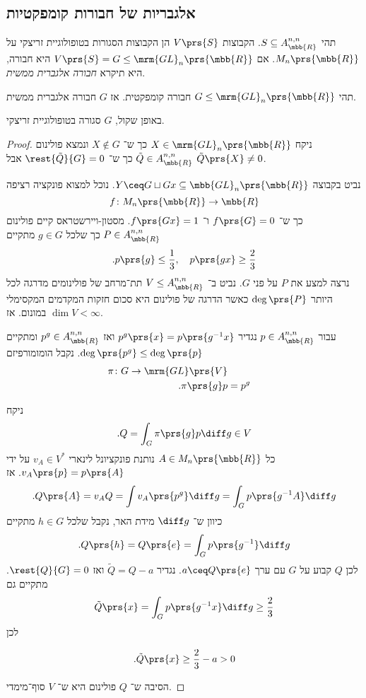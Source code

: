 \documentclass[10pt, twoside]{book}
\begin{document}

\subsection{אלגבריות של חבורות קומפקטיות}

\begin{definition}
תהי
$S \subseteq A_{\mbb{R}}^{n, n}$.
הקבוצות
$V\prs{S}$
הן הקבוצות הסגורות בטופולוגיית זריצקי על
$M_n\prs{\mbb{R}}$.
אם
$V\prs{S} = G \leq \mrm{GL}_n\prs{\mbb{R}}$
היא חבורה, היא תיקרא
\emph{חבורה אלגברית ממשית}.
\end{definition}

\begin{theorem}
תהי
$G \leq \mrm{GL}_n\prs{\mbb{R}}$
חבורה קומפקטית. אז
$G$
חבורה אלגברית ממשית.

באופן שקול,
$G$
סגורה בטופולוגיית זריצקי.
\end{theorem}

\begin{proof}
ניקח
$X \in \mrm{GL}_n\prs{\mbb{R}}$
כך ש־%
$X \notin G$
ונמצא פולינום
$\tilde{Q} \in A^{n,n}_{\mbb{R}}$
כך ש־%
$\rest{\tilde{Q}}{G} = 0$
אבל
$\tilde{Q}\prs{X} \neq 0$.

נביט בקבוצה
$Y \ceq G \sqcup G x \subseteq \mbb{GL}_n\prs{\mbb{R}}$.
נוכל למצוא פונקציה רציפה
\[f \colon M_n\prs{\mbb{R}} \to \mbb{R}\]
כך ש־%
$f\prs{G} = 0$
ו־%
$f\prs{G x} = 1$.
מסטון-ויירשטראס קיים פולינום
$P \in A^{n,n}_{\mbb{R}}$
כך שלכל
$g \in G$
מתקיים
\[\text{.} p\prs{g} \leq \frac{1}{3}, \quad p\prs{gx} \geq \frac{2}{3}\]
נרצה למצע את
$P$
על פני
$G$.
נביט ב־%
$V \leq A^{n,n}_{\mbb{R}}$
תת־מרחב של פולינומים מדרגה לכל היותר
$\deg\prs{P}$
כאשר הדרגה של פולינום היא סכום חזקות המקדמים המקסימלי במונום.
אז
$\dim V < \infty$.

עבור
$p \in A^{n,n}_{\mbb{R}}$
נגדיר
$p^g\prs{x} = p\prs{g^{-1} x}$
ואז
$p^g \in A^{n,n}_{\mbb{R}}$
ומתקיים
$\deg\prs{p^g} \leq \deg\prs{p}$.
נקבל הומומורפיזם
\begin{align*}
\pi \colon G \to \mrm{GL}\prs{V} \\
\text{.} \pi\prs{g} p &= p^g
\end{align*}

ניקח
\[\text{.}Q = \int_G \pi\prs{g} p \diff g \in V\]
כל
$A \in M_n\prs{\mbb{R}}$
נותנת פונקציונל לינארי
$v_A \in V^*$
על ידי
$v_A\prs{p} = p\prs{A}$.
אז
\[\text{.} Q\prs{A} = v_A Q = \int v_A\prs{p^g} \diff g = \int_G p\prs{g^{-1} A} \diff g\]
כיוון ש־%
$\diff g$
מידת האר, נקבל שלכל
$h \in G$
מתקיים
\[\text{.} Q\prs{h} = Q\prs{e} = \int_G p\prs{g^{-1}} \diff g\]
לכן
$Q$
קבוע על
$G$
עם ערך
$a \ceq Q\prs{e}$.
נגדיר
$\tilde{Q} = Q - a$
ואז
$\rest{Q}{G} = 0$.
מתקיים גם
\[\tilde{Q}\prs{x} = \int_G p\prs{g^{-1} x}\diff g \geq \frac{2}{3}\]
לכן
\begin{otherlanguage}{english}
\[\text{.} \tilde{Q}\prs{x} \geq \frac{2}{3} - a > 0\]
\end{otherlanguage}

הסיבה ש־%
$Q$
פולינום היא ש־%
$V$
סוף־מימדי.
\end{proof}
\end{document}
